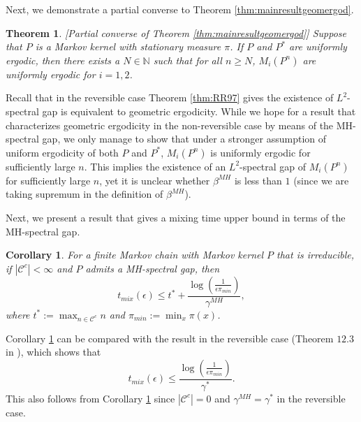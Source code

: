 \documentclass[12pt,a4]{amsart}
\numberwithin{equation}{section}
\theoremstyle{plain}
\newtheorem{theorem}{Theorem}[section]
\newtheorem{corollary}{Corollary}[section]
\theoremstyle{definition}
\theoremstyle{remark}
\newcommand{\1}{\mathds{1}}
\renewcommand{\leq}{\leqslant}
\renewcommand{\geq}{\geqslant}
\begin{document}
Next, we demonstrate a partial converse to Theorem \ref{thm:mainresultgeomergod}.

\begin{theorem}\label{thm:mainresultgeomergod2}[Partial converse of Theorem \ref{thm:mainresultgeomergod}]
	Suppose that $P$ is a Markov kernel with stationary measure $\pi$. If $P$ and $P^*$ are uniformly ergodic, then there exists a $N \in \mathbb{N}$ such that for all $n \geq N$, $M_i(P^n)$ are uniformly ergodic for $i=1,2$.
\end{theorem}

Recall that in the reversible case Theorem \ref{thm:RR97} gives the existence of $L^2$-spectral gap is equivalent to geometric ergodicity. While we hope for a result that characterizes geometric ergodicity in the non-reversible case by means of the MH-spectral gap, we only manage to show that under a stronger assumption of uniform ergodicity of both $P$ and $P^*$, $M_i(P^n)$ is uniformly ergodic for sufficiently large $n$. This implies the existence of an $L^2$-spectral gap of $M_i(P^n)$ for sufficiently large $n$, yet it is unclear whether $\beta^{MH}$ is less than $1$ (since we are taking supremum in the definition of $\beta^{MH}$).

Next, we present a result that gives a mixing time upper bound in terms of the MH-spectral gap.

\begin{corollary}\label{cor:mainresultgeomergod}
	For a finite Markov chain with Markov kernel $P$ that is irreducible, if $|\mathcal{C}^c| < \infty$ and $P$ admits a MH-spectral gap, then
	$$t_{mix}(\epsilon) \leq t^* + \dfrac{\log \left( \frac{1}{ \epsilon \pi_{min}}\right)}{\gamma^{MH}},$$
	where $t^* := \max_{n \in \mathcal{C}^c} n$ and $\pi_{min} := \min_x \pi(x)$.
\end{corollary}

Corollary \ref{cor:mainresultgeomergod} can be compared with the result in the reversible case (Theorem $12.3$ in \cite{LPW09}), which shows that
$$t_{mix}(\epsilon) \leq \dfrac{\log \left( \frac{1}{ \epsilon \pi_{min}}\right)}{\gamma^*}.$$
This also follows from Corollary \ref{cor:mainresultgeomergod} since $|\mathcal{C}^c| = 0$ and $\gamma^{MH} = \gamma^*$ in the reversible case.

\end{document}
